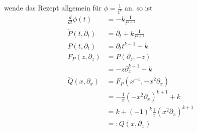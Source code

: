 \begin{comment}
warum sind diese wichtig??
\end{comment}

wende das Rezept allgemein für $\phi=\frac{1}{t^k}$ an.
so ist 
\begin{align*}
\frac{d}{dt}\phi(t)    &=-k\frac{1}{t^{k+1}}\\
\tilde P(t,\partial_t) &=\partial_t+k\frac{1}{t^{k+1}} \\
P(t,\partial_t)        &=\partial_tt^{k+1}+k \\
F_P(z,\partial_z)      &=P(\partial_z,-z)\\
                       &=-z\partial_z^{k+1}+k\\
\tilde Q(x,\partial_x) &=F_P(x^{-1},-x^2\partial_x) \\
                       &=-\frac{1}{x}(-x^2\partial_x)^{k+1}+k\\
                       &=k+(-1)^{k}\frac{1}{x}(x^2\partial_x)^{k+1}\\
                       &=:Q(x,\partial_x)
\end{align*}

